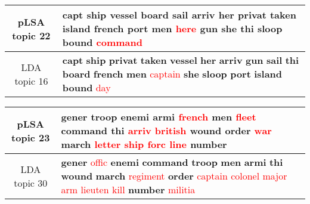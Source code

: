 \begin{center}\begin{tabularx}{\textwidth} {
  | c | >{\raggedright\arraybackslash}X | } \hline 
pLSA topic 22 & \textbf{capt} \textbf{ship} \textbf{vessel} \textbf{board} \textbf{sail} \textbf{arriv} \textbf{her} \textbf{privat} \textbf{taken} \textbf{island} \textbf{french} \textbf{port} \textbf{men} \textcolor{red}{here} \textbf{gun} \textbf{she} \textbf{thi} \textbf{sloop} \textbf{bound} \textcolor{red}{command} \\ \hline 
LDA topic 16 & \textbf{capt} \textbf{ship} \textbf{privat} \textbf{taken} \textbf{vessel} \textbf{her} \textbf{arriv} \textbf{gun} \textbf{sail} \textbf{thi} \textbf{board} \textbf{french} \textbf{men} \textcolor{red}{captain} \textbf{she} \textbf{sloop} \textbf{port} \textbf{island} \textbf{bound} \textcolor{red}{day} \\ \hline 
\end{tabularx}

\end{center}

\begin{center}\begin{tabularx}{\textwidth} {
  | c | >{\raggedright\arraybackslash}X | } \hline 
pLSA topic 23 & \textbf{gener} \textbf{troop} \textbf{enemi} \textbf{armi} \textcolor{red}{french} \textbf{men} \textcolor{red}{fleet} \textbf{command} \textbf{thi} \textcolor{red}{arriv} \textcolor{red}{british} \textbf{wound} \textbf{order} \textcolor{red}{war} \textbf{march} \textcolor{red}{letter} \textcolor{red}{ship} \textcolor{red}{forc} \textcolor{red}{line} \textbf{number} \\ \hline 
LDA topic 30 & \textbf{gener} \textcolor{red}{offic} \textbf{enemi} \textbf{command} \textbf{troop} \textbf{men} \textbf{armi} \textbf{thi} \textbf{wound} \textbf{march} \textcolor{red}{regiment} \textbf{order} \textcolor{red}{captain} \textcolor{red}{colonel} \textcolor{red}{major} \textcolor{red}{arm} \textcolor{red}{lieuten} \textcolor{red}{kill} \textbf{number} \textcolor{red}{militia} \\ \hline 
\end{tabularx}

\end{center}

